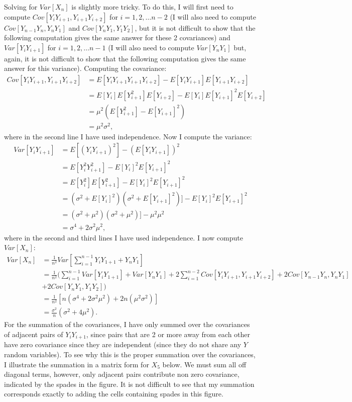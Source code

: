 \begin{problem}{15}
 Solving for $Var[X_n]$ is slightly more tricky.  To do this, I will first need to compute $Cov[Y_iY_{i+1}, Y_{i+1}Y_{i+2}]$ for $i=1, 2, \ldots n-2$ (I will also need to compute $Cov[Y_{n-1}Y_{n}, Y_{n}Y_{1}]$ and $Cov[Y_{n}Y_{1}, Y_{1}Y_{2}]$, but it is not difficult to show that the following computation gives the same answer for these 2 covariances) and $Var[Y_i Y_{i+1}]$ for $i=1, 2, \ldots n-1$ (I will also need to compute $Var[Y_nY_1]$ but, again, it is not difficult to show that the following computation gives the same answer for this variance).  Computing the covariance:
 \begin{align*}
Cov[Y_iY_{i+1}, Y_{i+1}Y_{i+2}] & = E[Y_iY_{i+1}Y_{i+1}Y_{i+2}]-E[Y_iY_{i+1}]E[Y_{i+1}Y_{i+2}] \\
&= E[Y_i]E[Y_{i+1}^2]E[Y_{i+2}]-E[Y_i]E[Y_{i+1}]^2E[Y_{i+2}] \\
& = \mu^2(E[Y_{i+1}^2]-E[Y_{i+1}]^2) \\
& = \mu^2 \sigma^2,
 \end{align*}
 where in the second line I have used independence.   Now I compute the variance:
  \begin{align*}
Var[Y_i Y_{i+1}]& = E[(Y_iY_{i+1})^2] -(E[Y_iY_{i+1}])^2\\
&=E[Y_i^2Y_{i+1}^2] -E[Y_i]^2E[Y_{i+1}]^2\\
&=E[Y_i^2]E[Y_{i+1}^2] -E[Y_i]^2E[Y_{i+1}]^2\\
&=(\sigma^2+E[Y_i]^2)(\sigma^2+E[Y_{i+1}]^2)] -E[Y_i]^2E[Y_{i+1}]^2\\
&=(\sigma^2+\mu^2)(\sigma^2+\mu^2)] -\mu^2 \mu^2\\
& = \sigma^4+2\sigma^2\mu^2,
 \end{align*}
 where in the second and third lines I have used independence.  I now compute $Var[X_n]$:
 \begin{align*}
 Var[X_n] &= \frac{1}{n^2}Var\left[ \sum_{i=1}^{n-1}Y_i Y_{1+1}+Y_nY_1\right] \\
 & = \frac{1}{n^2} \Bigg(\sum_{i=1}^{n-1}Var[Y_i Y_{1+1}]+Var[Y_nY_1]+2\sum_{i=1}^{n-2}Cov[Y_iY_{i+1}, Y_{i+1}Y_{i+2}]+2Cov[Y_{n-1}Y_n, Y_nY_1] \\
 &+2Cov[Y_{n}Y_1, Y_1Y_2]\Bigg) \\
 & = \frac{1}{n^2}[n(\sigma^4+2\sigma^2\mu^2)+2n(\mu^2 \sigma^2)] \\
 & = \frac{\sigma^2}{n}(\sigma^2+4\mu^2).
 \end{align*}
For the summation of the covariances, I have only summed over the covariances of adjacent pairs of $Y_iY_{i+1}$, since pairs that are 2 or more away from each other have zero covariance since they are independent (since they do not share any $Y$ random variables).  To see why this is the proper summation over the covariances, I illustrate the summation in a matrix form for $X_5$ below.  We must sum all off diagonal terms, however, only adjacent pairs contribute non zero covariance, indicated by the spades in the figure.  It is not difficult to see that my summation corresponds exactly to adding the cells containing spades in this figure.

\end{problem}
